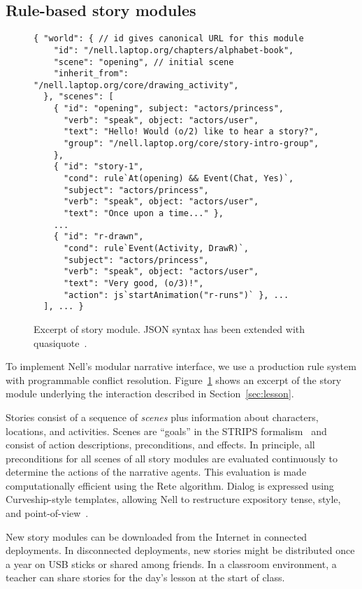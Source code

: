 \documentclass[preprint]{sig-alternate}
\begin{document}
\subsection{Rule-based story modules}
\begin{figure}\small
\begin{verbatim}
{ "world": { // id gives canonical URL for this module
    "id": "/nell.laptop.org/chapters/alphabet-book",
    "scene": "opening", // initial scene
    "inherit_from": "/nell.laptop.org/core/drawing_activity",
  }, "scenes": [
    { "id": "opening", subject: "actors/princess",
      "verb": "speak", object: "actors/user",
      "text": "Hello! Would (o/2) like to hear a story?",
      "group": "/nell.laptop.org/core/story-intro-group",
    },
    { "id": "story-1",
      "cond": rule`At(opening) && Event(Chat, Yes)`,
      "subject": "actors/princess",
      "verb": "speak", object: "actors/user",
      "text": "Once upon a time..." },
    ...
    { "id": "r-drawn",
      "cond": rule`Event(Activity, DrawR)`,
      "subject": "actors/princess",
      "verb": "speak", object: "actors/user",
      "text": "Very good, (o/3)!",
      "action": js`startAnimation("r-runs")` }, ...
  ], ... }
\end{verbatim}
\caption{Excerpt of story module.  JSON syntax has been extended with
quasiquote~\cite{quasiquote}.}\label{fig:rules}
\end{figure}
To implement Nell's modular narrative interface, we use a
production rule system with programmable conflict resolution.
Figure~\ref{fig:rules} shows
an excerpt of the story module underlying the interaction described in
Section~\ref{sec:lesson}.

Stories consist of a sequence of \textit{scenes} plus information about
characters, locations, and activities.  Scenes are ``goals''
in the STRIPS formalism~\cite{strips} and consist of
action descriptions, preconditions, and effects.
In principle, all preconditions for all scenes of all story modules
are evaluated continuously to determine the actions of the narrative
agents.  This evaluation
is made computationally efficient using the Rete
algorithm.  Dialog is expressed using Curveship-style
templates, allowing Nell to restructure
expository tense, style, and point-of-view~\cite{montfort:curveship}.


New story modules can be downloaded from the Internet in
connected deployments.  In disconnected deployments, new stories
might be distributed once a year on USB sticks or shared among
friends.  In a classroom environment, a teacher can share stories for
the day's lesson at the start of class.
\end{document}
